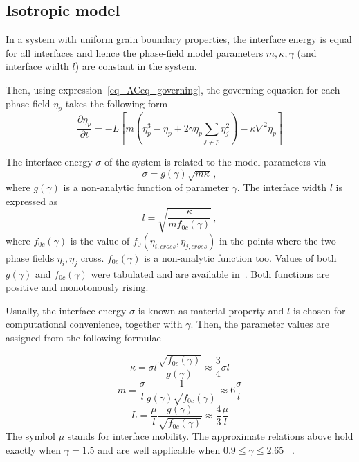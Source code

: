 \subsection{Isotropic model}
\label{sec_Models}
In a system with uniform grain boundary properties, the interface energy is equal for all interfaces and hence the phase-field model parameters $m,\kappa, \gamma$ (and interface width $l$) are constant in the system.

Then, using expression~\eqref{eq_ACeq_governing}, the governing equation for each phase field $\eta_p$ takes the following form %
\begin{equation}
	\frac{\partial \eta_p}{\partial t} = -L\left[ m\left( \eta_p^3-\eta_p +  2\gamma\eta_p\sum_{j\neq p}\eta_j^2 \right) - \kappa\nabla^2\eta_p \right] 
\end{equation}

The interface energy $\sigma$ of the system is related to the model parameters via 
\begin{equation}\label{eq_IE}
	\sigma = g(\gamma)\sqrt{m\kappa} \,,
\end{equation}
where $g(\gamma)$ is a non-analytic function of parameter $\gamma$. The interface width $l$ is expressed as
\begin{equation} \label{eq_IW}
	l = \sqrt{\frac{\kappa}{mf_{0c}(\gamma)}} \,,
\end{equation}
where $f_{0c}(\gamma)$ is the value of $f_0(\eta_{i,cross},\eta_{j,cross})$ in the points where the two phase fields $\eta_i,\eta_j$ cross. $f_{0c}(\gamma)$ is a non-analytic function too. Values of both $g(\gamma)$ and $f_{0c}(\gamma)$ were tabulated and are available in~\cite{Ravash2017}. Both functions are positive and monotonously rising.

Usually, the interface energy $\sigma$ is known as material property and $l$ is chosen for computational convenience, together with $\gamma$. Then, the parameter values are assigned from the following formulae

\begin{equation}\label{eq_def_kappa}
	\kappa = \sigma l\frac{\sqrt{f_{0c}(\gamma)}}{g(\gamma)} \approx \frac{3}{4}\sigma l
\end{equation}
\begin{equation} \label{eq_def_m}
	m = \frac{\sigma}{l}\frac{1}{g(\gamma)\sqrt{f_{0c}(\gamma)}} \approx 6 \frac{\sigma}{l}
\end{equation}
\begin{equation}\label{eq_def_L}
	L = \frac{\mu}{l}\frac{g(\gamma)}{\sqrt{f_{0c}(\gamma)}} \approx \frac{4}{3} \frac{\mu}{l}
\end{equation}
The symbol $\mu$ stands for interface mobility. The approximate relations above hold exactly when $\gamma=1.5$ and are well applicable when $0.9 \leq \gamma \leq 2.65$ ~\cite{Moelans2008}. 


